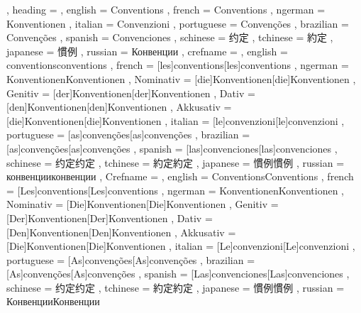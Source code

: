   {
    , heading =   {
                    , english     = Conventions
                    , french      = Conventions
                    , ngerman     = Konventionen
                    , italian     = Convenzioni
                    , portuguese  = Convenções
                    , brazilian   = Convenções
                    , spanish     = Convenciones
                    , schinese    = 约定
                    , tchinese    = 約定
                    , japanese    = 慣例
                    , russian     = Конвенции
                  }
    , crefname =  {
                    , english     = {conventions}{conventions}
                    , french      = [les]{conventions}[les]{conventions}
                    , ngerman     = { {Konventionen}{Konventionen}
                                      , Nominativ = [die]{Konventionen}[die]{Konventionen}
                                      , Genitiv   = [der]{Konventionen}[der]{Konventionen}
                                      , Dativ     = [den]{Konventionen}[den]{Konventionen}
                                      , Akkusativ = [die]{Konventionen}[die]{Konventionen}
                                    }
                    , italian     = [le]{convenzioni}[le]{convenzioni}
                    , portuguese  = [as]{convenções}[as]{convenções}
                    , brazilian   = [as]{convenções}[as]{convenções}
                    , spanish     = [las]{convenciones}[las]{convenciones}
                    , schinese    = {约定}{约定}
                    , tchinese    = {約定}{約定}
                    , japanese    = {慣例}{慣例}
                    , russian     = {конвенции}{конвенции}
                  }
    , Crefname =  {
                    , english     = {Conventions}{Conventions}
                    , french      = [Les]{conventions}[Les]{conventions}
                    , ngerman     = { {Konventionen}{Konventionen}
                                      , Nominativ = [Die]{Konventionen}[Die]{Konventionen}
                                      , Genitiv   = [Der]{Konventionen}[Der]{Konventionen}
                                      , Dativ     = [Den]{Konventionen}[Den]{Konventionen}
                                      , Akkusativ = [Die]{Konventionen}[Die]{Konventionen}
                                    }
                    , italian     = [Le]{convenzioni}[Le]{convenzioni}
                    , portuguese  = [As]{convenções}[As]{convenções}
                    , brazilian   = [As]{convenções}[As]{convenções}
                    , spanish     = [Las]{convenciones}[Las]{convenciones}
                    , schinese    = {约定}{约定}
                    , tchinese    = {約定}{約定}
                    , japanese    = {慣例}{慣例}
                    , russian     = {Конвенции}{Конвенции}
                  }
  }

